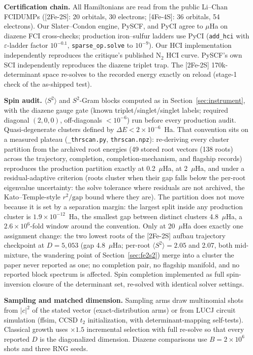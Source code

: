 \documentclass[11pt]{article}
\newcommand{\ssq}{\ensuremath{\langle S^2\rangle}}
\begin{document}
\textbf{Certification chain.} All Hamiltonians are read from the public Li--Chan FCIDUMPs ([2Fe-2S]: 20 orbitals, 30 electrons; [4Fe-4S]: 36 orbitals, 54 electrons). Our Slater--Condon engine, PySCF, and PyCI agree to $\mu$Ha on diazene FCI cross-checks; production iron--sulfur ladders use PyCI (\texttt{add\_hci} with $\varepsilon$-ladder factor $10^{-0.1}$, \texttt{sparse\_op.solve} to $10^{-9}$). Our HCI implementation independently reproduces the critique's published N$_2$ HCI curve. PySCF's own SCI independently reproduces the diazene triplet trap. The [2Fe-2S] 170k-determinant space re-solves to the recorded energy exactly on reload (stage-1 check of the as-shipped test).

\textbf{Spin audit.} \ssq{} and $S^2$-Gram blocks computed as in Section~\ref{sec:instrument}, with the diazene gauge gate (known triplet/singlet/singlet labels; required diagonal $(2,0,0)$, off-diagonals $<10^{-6}$) run before every production audit. Quasi-degenerate clusters defined by $\Delta E < 2\times10^{-6}$~Ha. That convention sits on a measured plateau (\texttt{\_thrscan.py}, \texttt{thrscan.npz}): re-deriving every cluster partition from the archived root energies (49 stored root vectors (138 roots) across the trajectory, completion, completion-mechanism, and flagship records) reproduces the production partition exactly at 0.2~$\mu$Ha, at 2~$\mu$Ha, and under a residual-adaptive criterion (roots cluster when their gap falls below the per-root eigenvalue uncertainty: the solve tolerance where residuals are not archived, the Kato--Temple-style $r^2/\mathrm{gap}$ bound where they are). The partition does not move because it is set by a separation margin: the largest split inside any production cluster is $1.9\times10^{-12}$~Ha, the smallest gap between distinct clusters 4.8~$\mu$Ha, a $2.6\times10^6$-fold window around the convention. Only at 20~$\mu$Ha does exactly one assignment change: the two lowest roots of the [2Fe-2S] aufbau trajectory checkpoint at $D=5{,}053$ (gap 4.8~$\mu$Ha; per-root $\ssq=2.05$ and 2.07, both mid-mixture, the wandering point of Section~\ref{sec:fe2s2}) merge into a cluster the paper never reported as one; no completion pair, no flagship manifold, and no reported block spectrum is affected. Spin completion implemented as full spin-inversion closure of the determinant set, re-solved with identical solver settings.

\textbf{Sampling and matched dimension.} Sampling arms draw multinomial shots from $|c|^2$ of the stated vector (exact-distribution arms) or from LUCJ circuit simulation (ffsim, CCSD $t_2$ initialization, with determinant-mapping self-tests). Classical growth uses $\times1.5$ incremental selection with full re-solve so that every reported $D$ is the diagonalized dimension. Diazene comparisons use $B=2\times10^6$ shots and three RNG seeds.
\end{document}
